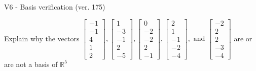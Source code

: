 \begin{exercise}
  \begin{exerciseTitle}V6 - Basis verification (ver. 175)\end{exerciseTitle}
  \begin{exerciseStatement}
    Explain why the vectors \(\left[\begin{array}{r}
-1 \\
-1 \\
4 \\
1 \\
2
\end{array}\right] , \left[\begin{array}{r}
1 \\
-3 \\
-1 \\
2 \\
-5
\end{array}\right] , \left[\begin{array}{r}
0 \\
-2 \\
-2 \\
2 \\
-1
\end{array}\right] , \left[\begin{array}{r}
2 \\
1 \\
-1 \\
-2 \\
-4
\end{array}\right] , \text{ and } \left[\begin{array}{r}
-2 \\
2 \\
2 \\
-3 \\
-4
\end{array}\right]\) are or are not a basis of \(\mathbb{R}^5\)	



\end{exerciseStatement}
\end{exercise}
